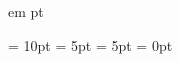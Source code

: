 \newcommand{\mysection}[1]{{\vskip 0 pt \noindent \bf \large #1\\ \vskip -15 pt }}
\newcommand{\mysubsection}[1]{{\noindent\bf\large #1 \\\vskip -15 pt}}
\newcommand{\mysubsubsection}[1]{{\noindent\bf\em #1}}

 em
 pt





\usepackage[font={small,sf},labelfont=bf]{caption} %
\renewcommand\floatpagefraction{.8}
\renewcommand\topfraction{.8}
\renewcommand\bottomfraction{.8}
\renewcommand\textfraction{.2}
\floatsep = 10pt  		%
\abovecaptionskip = 5pt 	%
\belowcaptionskip = 5pt	%
\dbltextfloatsep = 0pt 	%




\newcommand{\Line}[0]{
\vspace{-20pt}    %
\rule{0pt}{0pt}\hrule\rule{0pt}{0pt}
}


\newcommand{\SkipSection}[2]{
	\ifnum #1 = 1
	\else 
		#2
	\fi
}


